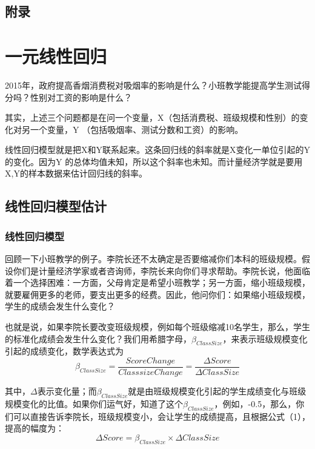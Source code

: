 \documentclass[cn,10pt,math=newtx,citestyle=gb7714-2015,bibstyle=gb7714-2015]{elegantbook}
\begin{document}
	
	
	\section{附录}
	
	
	
	\chapter{一元线性回归}
	
	2015年，政府提高香烟消费税对吸烟率的影响是什么？小班教学能提高学生测试得分吗？性别对工资的影响是什么？
	
	其实，上述三个问题都是在问一个变量，X（包括消费税、班级规模和性别）的变化对另一个变量，Y （包括吸烟率、测试分数和工资）的影响。
	
	线性回归模型就是把X和Y联系起来。这条回归线的斜率就是X变化一单位引起的Y的变化。因为Y 的总体均值未知，所以这个斜率也未知。而计量经济学就是要用X,Y的样本数据来估计回归线的斜率。
	\section{线性回归模型估计}
	\subsection{线性回归模型}
	回顾一下小班教学的例子。李院长还不太确定是否要缩减你们本科的班级规模。假设你们是计量经济学家或者咨询师，李院长来向你们寻求帮助。李院长说，他面临着一个选择困难：一方面，父母肯定是希望小班教学；另一方面，缩小班级规模，就要雇佣更多的老师，要支出更多的经费。因此，他问你们：如果缩小班级规模，学生的成绩会发生什么变化？
	
	也就是说，如果李院长要改变班级规模，例如每个班级缩减10名学生，那么，学生的标准化成绩会发生什么变化？我们用希腊字母，$\beta_{ClassSize}$，来表示班级规模变化引起的成绩变化，数学表达式为
	\begin{equation}
		\beta_{ClassSize}=\frac{Score Change}{Classsize Change}=\frac{\Delta{Score}}{\Delta{ClassSize}}
	\end{equation}
	
	其中，$\Delta$表示变化量；而$\beta_{ClassSize}$就是由班级规模变化引起的学生成绩变化与班级规模变化的比值。如果你们运气好，知道了这个$\beta_{ClassSize}$，例如，-0.5，那么，你们可以直接告诉李院长，班级规模变小，会让学生的成绩提高，且根据公式（1），提高的幅度为：
	\begin{equation}
		\Delta{Score}=\beta_{ClassSize}\times\Delta{ClassSize}
	\end{equation}
	
\end{document}
